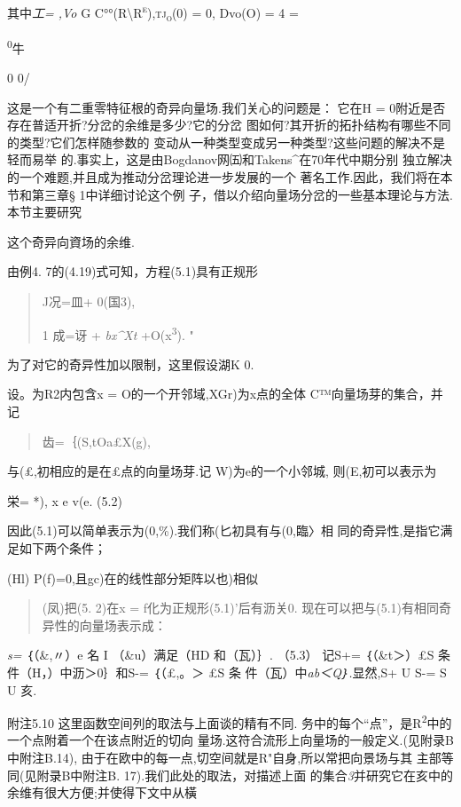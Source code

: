 \documentclass{article}
\begin{document}
其中\emph{工= ,Vo} G
\textsc{C°°(R\textbackslash{}R\textsuperscript{e}),tj\textsubscript{o}(0)}
= 0, Dvo(O) = 4 =

\textsuperscript{0}牛

0 0/

这是一个有二重零特征根的奇异向量场.我们关心的问题是： 它在H =
0附近是否存在普适开折?分岔的余维是多少?它的分岔
图如何?其开折的拓扑结构有哪些不同的类型?它们怎样随参数的
变动从一种类型变成另一种类型?这些问题的解决不是轻而易举
的.事实上，这是由Bogdanov网㈤和Takens\^{}在70年代中期分别
独立解决的一个难题,并且成为推动分岔理论进一步发展的一个
著名工作.因此，我们将在本节和第三章§ 1中详细讨论这个例
子，借以介绍向量场分岔的一些基本理论与方法.本节主要研究

这个奇异向資场的余维.

由例4. 7的(4.19)式可知，方程(5.1)具有正规形

\begin{quote}
J况=皿+ 0(国3),

1 成=讶 + \emph{bx\^{}Xt} +O(\textbar{}x\textbar{}\textsuperscript{3}).
"
\end{quote}

为了对它的奇异性加以限制，这里假设湖K 0.

设。为R2内包含x = O的一个开邻域,XGr)为x点的全体 C™向量场芽的集合，并记

\begin{quote}
齿=｛(S,tO\textbar{}a£X(g),
\end{quote}

与(£,初相应的是在£点的向量场芽.记 W)为e的一个小邻城, 则(E,初可以表示为

栄= *), x e v(e. (5.2)

因此(5.1)可以简单表示为(0,\%).我们称(匕初具有与(0,臨〉相
同的奇异性,是指它满足如下两个条件；

(Hl) P(f)=0,且gc)在的线性部分矩阵以也)相似

\begin{quote}
(凤)把(5. 2)在x = f化为正规形(5.1)'后有沥关0.
现在可以把与(5.1)有相同奇异性的向量场表示成：
\end{quote}

\emph{s=} ｛（\&,〃）e 名 I （\&u）满足（HD 和（瓦）｝. （5.3） 记S+=
｛（\&t＞）£S\textbar{} 条件（H，）中沥＞0｝和S-= ｛（£,。＞
£S\textbar{} 条 件（瓦）中\emph{ab＜Q｝.}显然,S+ U S-= S U 亥.

附注5.10 这里函数空间列的取法与上面谈的精有不同.
务中的每个``点''，是R\textsuperscript{2}中的一个点附着一个在该点附近的切向
量场.这符合流形上向量场的一般定义.(见附录B中附注B.14),
由于在欧中的每一点,切空间就是R"自身,所以常把向景场与其
主部等同(见附录B中附注B. 17).我们此处的取法，对描述上面
的集合\emph{3}并研究它在亥中的余维有很大方便;并使得下文中从橫
\end{document}
